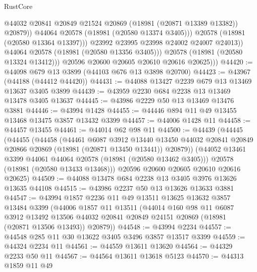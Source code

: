 \begin{lexlean}{RustCore}
\begin{coremodule}
                          @44032
                          @20841
                          @20849
                          @21524
                          @20869
                          (@18981 (@20871 @13389 @13382))
                          @20879))
                      @44064
                      @20578
                      (@18981 (@20580 @13374 @3405)))
                    @20578
                    (@18981 (@20580 @13364 @13397)))
                  @23992
                  @23995
                  @23998
                  @24002
                  @24007
                  @24013))
              @44064
              @20578
              (@18981 (@20580 @13356 @3405)))
            @20578
            (@18981 (@20580 @13324 @13412)))
          @20596
          @20600
          @20605
          @20610
          @20616
          @20625)))
@44420 := @44098 @679 @13 @3899 (@44103 @676 @13 @3898 @20700)
@44423 := @43967 (@44188 (@44412 @44420))
@44431 := @44088 @13427 @2239 @679 @13 @13469 @13637 @3405 @3899
@44439 := @43959 @2230 @684 @2238 @13 @13469 @13478 @3405 @13637
@44445 := @43986 @2229 @50 @13 @13469 @13476 @3881
@44446 := @43994 @1428
@44455 := @44446 @894 @11 @49 @13455 @13468 @13475 @3857 @13432 @3399
@44457 := @44006 @1428 @11
@44458 := @44457 @13455
@44461 := @44014 @62 @98 @11
@44500 := @44439
    (@44445
      (@44455
        (@44458
          (@44461
            @6087
            @3912
            @13440
            @13450
            @44032
            @20841
            @20849
            @20866
            @20869
            (@18981 (@20871 @13450 @13441))
            @20879))
        (@44052 @13461 @3399 @44061 @44064 @20578 (@18981 (@20580 @13462 @3405)))
        @20578
        (@18981 (@20580 @13433 @13468)))
      @20596
      @20600
      @20605
      @20610
      @20616
      @20625)
@44509 := @44088 @13478 @684 @2238 @13 @3405 @3976 @13626 @13635 @44108
@44515 := @43986 @2237 @50 @13 @13626 @13633 @3881
@44547 := @43994
    @1857
    @2236
    @11
    @49
    @13511
    @13625
    @13632
    @3857
    @13484
    @3399
    (@44006
      @1857
      @11
      @13511
      (@44014
        @160
        @98
        @11
        @6087
        @3912
        @13492
        @13506
        @44032
        @20841
        @20849
        @24151
        @20869
        (@18981 (@20871 @13506 @13493))
        @20879))
@44548 := @43994 @2234
@44557 := @44548 @285 @11 @30 @13622 @3405 @3496 @3857 @13517 @3399
@44559 := @44324 @2234 @11
@44561 := @44559 @13611 @13620
@44564 := @44329 @2233 @50 @11
@44567 := @44564 @13611 @13618 @5123
@44570 := @44313 @1859 @11 @49

\end{coremodule}
\end{lexlean}
